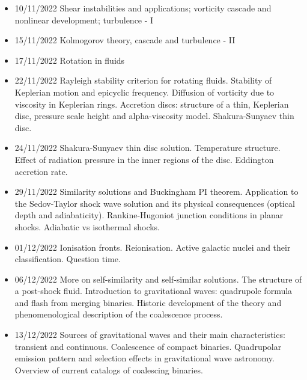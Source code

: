 \begin{itemize}
    \item 10/11/2022 Shear instabilities and applications; vorticity cascade and nonlinear development; turbulence - I 
    \item 15/11/2022 Kolmogorov theory, cascade and turbulence - II 
    \item 17/11/2022 Rotation in fluids 
    \item 22/11/2022 Rayleigh stability criterion for rotating fluids. Stability of Keplerian motion and epicyclic frequency. Diffusion of vorticity due to viscosity in Keplerian rings. Accretion discs: structure of a thin, Keplerian disc, pressure scale height and alpha-viscosity model. Shakura-Sunyaev thin disc. 
    \item 24/11/2022 Shakura-Sunyaev thin disc solution. Temperature structure. Effect of radiation pressure in the inner regions of the disc. Eddington accretion rate. 
    \item 29/11/2022 Similarity solutions and Buckingham PI theorem. Application to the Sedov-Taylor shock wave solution and its physical consequences (optical depth and adiabaticity). Rankine-Hugoniot junction conditions in planar shocks. Adiabatic vs isothermal shocks. 
    \item 01/12/2022 Ionisation fronts. Reionisation. Active galactic nuclei and their classification. Question time. 
    \item 06/12/2022 More on self-similarity and self-similar solutions. The structure of a post-shock fluid. Introduction to gravitational waves: quadrupole formula and flash from merging binaries. Historic development of the theory and phenomenological description of the coalescence process. 
    \item 13/12/2022 Sources of gravitational waves and their main characteristics: transient and continuous. Coalescence of compact binaries. Quadrupolar emission pattern and selection effects in gravitational wave astronomy. Overview of current catalogs of coalescing binaries. 

\end{itemize}

